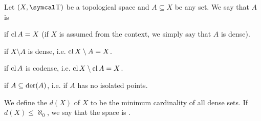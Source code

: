 \begin{definition}\label{def:topologically_dense_set}\cite[25]{Engelking1989}
  Let \( (X, \CT) \) be a topological space and \( A \subseteq X \) be any set. We say that \( A \) is

  \begin{defenum}
      if \( \operatorname{cl}{A} = X \) (if \( X \) is assumed from the context, we simply say that \( A \) is dense).

      if \( X \setminus A \) is dense, i.e. \( \operatorname{cl}{X \setminus A} = X \).

      if \( \operatorname{cl}{A} \) is codense, i.e. \( \operatorname{cl}{X \setminus \operatorname{cl}{A}} = X \).

      if \( A \subseteq \operatorname{der}(A) \), i.e. if \( A \) has no isolated points.
  \end{defenum}

  We define the  \( d(X) \) of \( X \) to be the minimum cardinality of all dense sets. If \( d(X) \leq \aleph_0 \), we say that the space is .
\end{definition}
